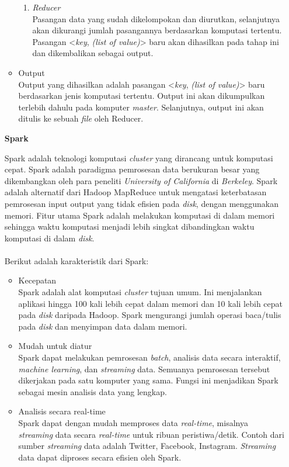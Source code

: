 \documentclass[a4paper,twoside]{article}
\begin{document}
\begin{enumerate}
\begin{itemize}
\begin{enumerate}
\item \textit{Reducer} \\
Pasangan data yang sudah dikelompokan dan diurutkan, selanjutnya akan dikurangi jumlah pasangannya berdasarkan komputasi tertentu. Pasangan <\textit{key},  \textit{(list of value)}> baru akan dihasilkan pada tahap ini dan dikembalikan sebagai output.
\end{enumerate}

\item Output\\
Output yang dihasilkan adalah pasangan <\textit{key}, \textit{(list of value)}> baru berdasarkan jenis komputasi tertentu. Output ini akan dikumpulkan terlebih dahulu pada komputer \textit{master}. Selanjutnya, output ini akan ditulis ke sebuah \textit{file} oleh Reducer.
\end{itemize}
	
\newpage	
\textbf{Spark}

Spark adalah teknologi komputasi \textit{cluster} yang dirancang untuk komputasi cepat. Spark adalah paradigma pemrosesan data berukuran besar yang dikembangkan oleh para peneliti \textit{University of California} di \textit{Berkeley}. Spark adalah alternatif dari Hadoop MapReduce untuk mengatasi keterbatasan pemrosesan input output yang tidak efisien pada \textit{disk}, dengan menggunakan memori. Fitur utama Spark adalah melakukan komputasi di dalam memori sehingga waktu komputasi menjadi lebih singkat dibandingkan waktu komputasi di dalam \textit{disk}.
\\\\
Berikut adalah karakteristik dari Spark:
\begin{itemize}
\item Kecepatan\\
Spark adalah alat komputasi \textit{cluster} tujuan umum. Ini menjalankan aplikasi hingga 100 kali lebih cepat dalam memori dan 10 kali lebih cepat pada \textit{disk} daripada Hadoop. Spark mengurangi jumlah operasi baca/tulis pada \textit{disk} dan menyimpan data dalam memori.


\item Mudah untuk diatur\\	
Spark dapat melakukan pemrosesan \textit{batch}, analisis data secara interaktif, \textit{machine learning}, dan \textit{streaming} data. Semuanya pemrosesan tersebut dikerjakan pada satu komputer yang sama. Fungsi ini menjadikan Spark sebagai mesin analisis data yang lengkap. 


\item Analisis secara real-time\\
Spark dapat dengan mudah memproses data \textit{real-time}, misalnya \textit{streaming} data secara \textit{real-time} untuk ribuan peristiwa/detik. Contoh dari sumber \textit{streaming} data adalah Twitter, Facebook, Instagram. \textit{Streaming} data dapat diproses secara efisien oleh Spark.
\end{itemize}


\end{enumerate}
\end{document}
